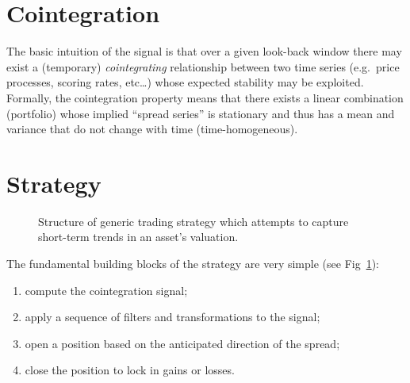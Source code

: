 \section{Cointegration}
The basic intuition of the signal is that over a given look-back window there
may exist a (temporary) \emph{cointegrating} relationship between two time
series (e.g.\ price processes, scoring rates, etc\ldots) whose expected
stability may be exploited. Formally, the cointegration property means that
there exists a linear combination (portfolio) whose implied ``spread series''
is stationary and thus has a mean and variance that do not change with time
(time-homogeneous).


\section{Strategy}
\begin{figure}
    \centering

    \caption{Structure of generic trading strategy which attempts to capture
    short-term trends in an asset's valuation.}\label{fig:strategy_basic}
\end{figure}

The fundamental building blocks of the strategy are very simple (see
Fig~\ref{fig:strategy_basic}):
\begin{enumerate}
    \item compute the cointegration signal;
    \item apply a sequence of filters and transformations to the signal;
    \item open a position based on the anticipated direction of the spread;
    \item close the position to lock in gains or losses.
\end{enumerate}

